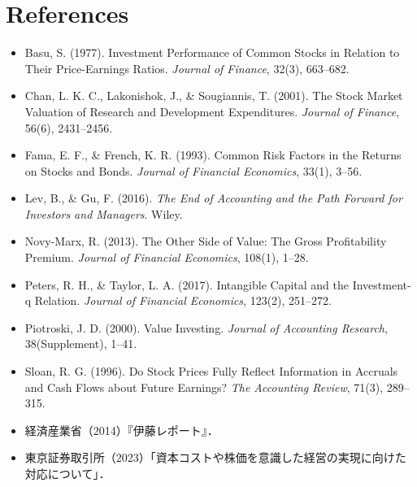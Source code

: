 \documentclass[a4paper,10pt]{article}
\begin{document}
\section{References}
\begin{itemize}
\item Basu, S. (1977). Investment Performance of Common Stocks in Relation to Their Price-Earnings Ratios. \emph{Journal of Finance}, 32(3), 663--682.
\item Chan, L. K. C., Lakonishok, J., \& Sougiannis, T. (2001). The Stock Market Valuation of Research and Development Expenditures. \emph{Journal of Finance}, 56(6), 2431--2456.
\item Fama, E. F., \& French, K. R. (1993). Common Risk Factors in the Returns on Stocks and Bonds. \emph{Journal of Financial Economics}, 33(1), 3--56.
\item Lev, B., \& Gu, F. (2016). \emph{The End of Accounting and the Path Forward for Investors and Managers}. Wiley.
\item Novy-Marx, R. (2013). The Other Side of Value: The Gross Profitability Premium. \emph{Journal of Financial Economics}, 108(1), 1--28.
\item Peters, R. H., \& Taylor, L. A. (2017). Intangible Capital and the Investment-q Relation. \emph{Journal of Financial Economics}, 123(2), 251--272.
\item Piotroski, J. D. (2000). Value Investing. \emph{Journal of Accounting Research}, 38(Supplement), 1--41.
\item Sloan, R. G. (1996). Do Stock Prices Fully Reflect Information in Accruals and Cash Flows about Future Earnings? \emph{The Accounting Review}, 71(3), 289--315.
\item 経済産業省（2014）『伊藤レポート』．
\item 東京証券取引所（2023）「資本コストや株価を意識した経営の実現に向けた対応について」．
\end{itemize}
\end{document}

